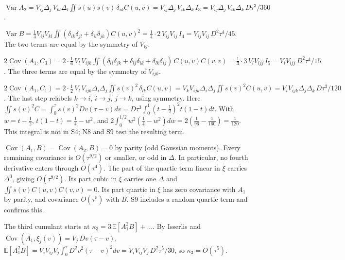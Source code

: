 \documentclass[11pt,a4paper]{article}
\begin{document}
\(\operatorname{Var}A_2=V_{ij}\Delta_j\,V_{kl}\Delta_l\iint s(u)s(v)\,\delta_{ik}C(u,v)=V_{ij}\Delta_j\,V_{ik}\Delta_k\,I_3=V_{ij}\Delta_j\,V_{ik}\Delta_k\,D\tau^3/360\).

\(\operatorname{Var}B=\tfrac14V_{ij}V_{kl}\iint(\delta_{ik}\delta_{jl}+\delta_{il}\delta_{jk})C(u,v)^2=\tfrac14\cdot2\,V_{ij}V_{ij}\,I_4=V_{ij}V_{ij}\,D^2\tau^4/45\). The two terms are equal by the symmetry of \(V_{kl}\).

\(2\operatorname{Cov}(A_1,C_3)=2\cdot\tfrac16\,V_l\,V_{ijk}\iint(\delta_{li}\delta_{jk}+\delta_{lj}\delta_{ik}+\delta_{lk}\delta_{ij})\,C(u,v)C(v,v)=\tfrac13\cdot3\,V_lV_{ljj}\,I_5=V_iV_{ijj}\,D^2\tau^4/15\). The three terms are equal by the symmetry of \(V_{ijk}\).

\(2\operatorname{Cov}(A_1,C_1)=2\cdot\tfrac12\,V_l\,V_{ijk}\Delta_i\Delta_j\iint s(v)^2\,\delta_{lk}C(u,v)=V_kV_{ijk}\Delta_i\Delta_j\iint s(v)^2C(u,v)=V_iV_{ijk}\Delta_j\Delta_k\,D\tau^3/120\). The last step relabels \(k\to i\), \(i\to j\), \(j\to k\), using symmetry. Here \(\iint s(v)^2C=\int_0^\tau s(v)^2Dv(\tau-v)dv=D\tau^3\int_0^1(t-\tfrac12)^2t(1-t)dt\). With \(w=t-\tfrac12\), \(t(1-t)=\tfrac14-w^2\), and \(2\int_0^{1/2}w^2(\tfrac14-w^2)dw=2(\tfrac1{96}-\tfrac1{160})=\tfrac1{120}\). This integral is not in S4; N8 and S9 test the resulting term.

\(\operatorname{Cov}(A_1,B)=\operatorname{Cov}(A_2,B)=0\) by parity (odd Gaussian moments). Every remaining covariance is \(O(\tau^{9/2})\) or smaller, or odd in \(\Delta\). In particular, no fourth derivative enters through \(O(\tau^4)\). The part of the quartic term linear in \(\xi\) carries \(\Delta^3\), giving \(O(\tau^{9/2})\). Its part cubic in \(\xi\) carries one \(\Delta\) and \(\iint s(v)C(u,v)C(v,v)=0\). Its part quartic in \(\xi\) has zero covariance with \(A_1\) by parity, and covariance \(O(\tau^5)\) with \(B\). S9 includes a random quartic term and confirms this.

The third cumulant starts at \(\kappa_3=3\,\mathbb E[A_1^2B]+\dots\). By Isserlis and \(\operatorname{Cov}(A_1,\xi_j(v))=V_j\,Dv(\tau-v)\), \(\mathbb E[A_1^2B]=V_iV_{ij}V_j\int_0^\tau D^2v^2(\tau-v)^2dv=V_iV_{ij}V_j\,D^2\tau^5/30\), so \(\kappa_3=O(\tau^5)\).
\end{document}
